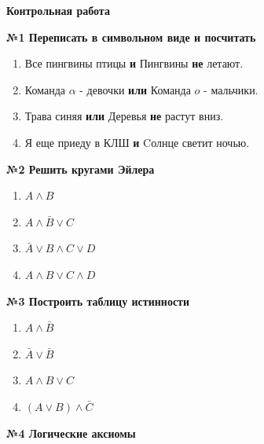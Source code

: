 



    \begin{center}
        \textbf{Контрольная работа}
    \end{center}

    \begin{center}
        \textbf{№1 Переписать в символьном виде и посчитать}
    \end{center}

    \begin{enumerate}
        \item Все пингвины птицы \textbf{и} Пингвины \textbf{не} летают.
        \item Команда $\alpha$ - девочки \textbf{или} Команда $o$ - мальчики.
        \item Трава синяя \textbf{или} Деревья \textbf{не} растут вниз.
        \item Я еще приеду в КЛШ \textbf{и} Cолнце светит ночью.
    \end{enumerate}

    \begin{center}
        \textbf{№2 Решить кругами Эйлера}
    \end{center}

    \begin{enumerate}
        \item $A \wedge B$
        \item $A \wedge \bar B \vee C$
        \item $\bar A \vee B \wedge C \vee D$
        \item $A \wedge B \vee C \wedge D$
    \end{enumerate}

    \begin{center}
        \textbf{№3 Построить таблицу истинности}
    \end{center}

    \begin{enumerate}
        \item $A \wedge \bar B$
        \item $\bar A \vee \bar B$
        \item $A \wedge B \vee C$
        \item $(A \vee B) \wedge \bar C$
    \end{enumerate}

    \begin{center}
        \textbf{№4 Логические аксиомы}
    \end{center}

